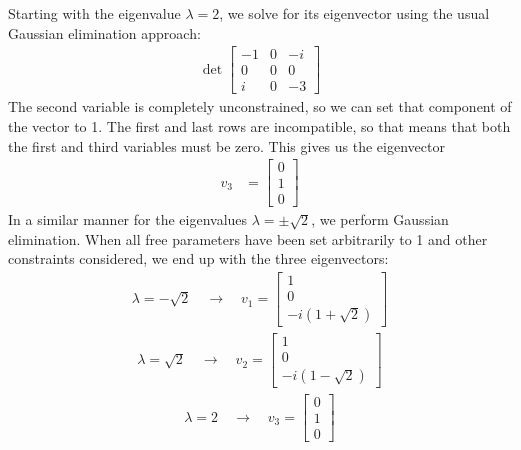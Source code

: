 Starting with the eigenvalue ${\lambda}=2$, we solve for its eigenvector using the
usual Gaussian elimination approach:
\begin{align*}
    \det{\begin{bmatrix}
	-1  & 0   & -i   \\
	0   & 0   & 0    \\
	i   & 0   & -3
    \end{bmatrix}}
\end{align*}
The second variable is completely unconstrained, so we can set that component
of the vector to 1. The first and last rows are incompatible, so that means
that both the first and third variables must be zero. This gives us the
eigenvector
\begin{align*}
    v_3 &= \begin{bmatrix} 0 \\ 1 \\ 0 \end{bmatrix}
\end{align*}
In a similar manner for the eigenvalues ${\lambda} = \pm\sqrt 2$, we perform Gaussian
elimination. When all free parameters have been set arbitrarily to 1 and other
constraints considered, we end up with the three eigenvectors:
\begin{align}
    \boxed{ {\lambda} = -\sqrt 2 \quad\rightarrow\quad v_1 =
	\begin{bmatrix} 1 \\ 0 \\ -i(1+\sqrt 2) \end{bmatrix} }
\end{align}
\begin{align}
    \boxed{ {\lambda} = \sqrt2 \quad\rightarrow\quad v_2 =
	\begin{bmatrix} 1 \\ 0 \\ -i(1-\sqrt 2) \end{bmatrix} }
\end{align}
\begin{align}
    \boxed{ {\lambda} = 2 \quad\rightarrow\quad v_3 =
	\begin{bmatrix} 0 \\ 1 \\ 0 \end{bmatrix} }
\end{align}

